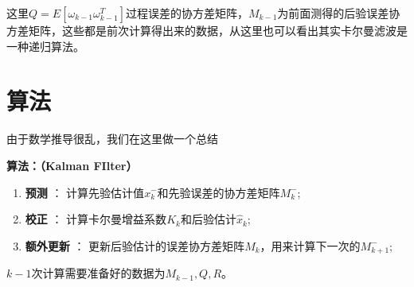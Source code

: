 这里$Q=E[\omega_{k-1}\omega^T_{k-1}]$过程误差的协方差矩阵，$M_{k-1}$为前面测得的后验误差协方差矩阵，这些都是前次计算得出来的数据，从这里也可以看出其实卡尔曼滤波是一种递归算法。

\section{算法}

由于数学推导很乱，我们在这里做一个总结
\begin{framed}
    \textbf{算法：（Kalman FIlter）}

    \begin{enumerate}[itemindent=2em]
        \item \textbf{预测} ： 计算先验估计值$x^{-}_k$和先验误差的协方差矩阵$M^{-}_k$;
        \item \textbf{校正} ： 计算卡尔曼增益系数$K_k$和后验估计$\hat{x}_k$;
        \item \textbf{额外更新} ： 更新后验估计的误差协方差矩阵$M_k$，用来计算下一次的$M^{-}_{k+1}$;
    \end{enumerate}
\end{framed}

$k-1$次计算需要准备好的数据为$M_{k-1},Q,R$。